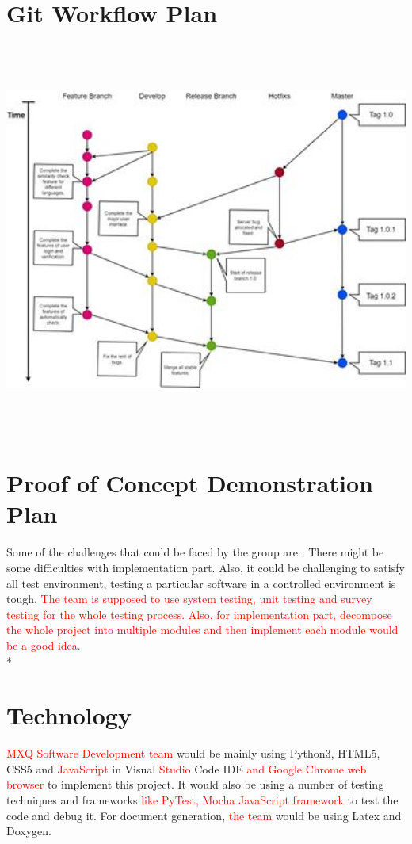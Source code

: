 \documentclass[12pt, titlepage]{article}
\begin{document}
\section{Git Workflow Plan}
\includegraphics[height=13cm,width=15cm]{workflow.jpg}

\section{Proof of Concept Demonstration Plan} 
Some of the challenges that could be faced by the group are : There might be some difficulties with implementation part. Also, it could be challenging to satisfy all test environment, testing a particular software in a controlled environment is tough. \textcolor{red}{The team is supposed to use system testing, unit testing and survey testing for the whole testing process. Also, for implementation part, decompose the whole project into multiple modules and then implement each module would be a good idea.} \\*


\section{Technology}
\textcolor{red}{MXQ Software Development team} would be mainly using Python3, HTML5, CSS5 and \textcolor{red}{JavaScript} in Visual \textcolor{red}{Studio} Code IDE \textcolor{red}{and Google Chrome web browser} to implement this project. It would also be using a number of testing techniques and frameworks \textcolor{red}{like PyTest, Mocha JavaScript framework} to test the code and debug it. For document generation, \textcolor{red}{the team} would be using Latex and Doxygen. 
\end{document}
